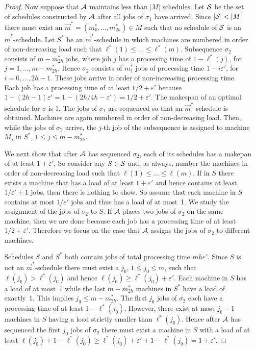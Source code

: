 \documentclass{llncs}
\newcommand{\eps}{\varepsilon}
\begin{document}
\begin{proof}
Now suppose that ${\cal A}$ maintains less than $|M|$ schedules. Let ${\cal S}$ be the set of schedules constructed
by ${\cal A}$ after all jobs of $\sigma_1$ have arrived. Since $|{\cal S}| <|M|$ there must exist an 
$\vec{m}^* = (m_0^*, \ldots, m_{2h}^*) \in M$ such that no schedule of ${\cal S}$ is an $\vec{m}^*$-schedule.
Let $S^*$ be an $\vec{m}^*$-schedule in which machines are numbered in order of non-decreasing load such that
$\ell^*(1) \leq \ldots \leq \ell^*(m)$. Subsequence $\sigma_2$ consists of $m-m_{2h}^*$ jobs, where job $j$
has a processing time of $1-\ell^*(j)$, for $j=1, \ldots,m-m_{2h}^*$. Hence $\sigma_2$ consists of $m_i^*$ jobs
of processing time $1-i\eps'$, for $i=0, \ldots, 2h-1$. These jobs arrive in order of non-increasing processing
time. Each job has a processing time of at least $1/2+\eps'$ because $1-(2h-1)\eps' = 1 - (2h/4h-\eps') = 1/2+\eps'$. 
The makespan of an optimal schedule for $\sigma$ is 1. The jobs of $\sigma_1$ are sequenced so that an 
$\vec{m}^*$-schedule is obtained. Machines are again numbered in order of non-decreasing load. Then, while
the jobs of $\sigma_2$ arrive, the $j$-th job of the subsequence is assigned to machine $M_j$ in $S^*$,
$1\leq j \leq m-m_{2h}^*$.

We next show that after ${\cal A}$ has sequenced $\sigma_2$, each of its schedules has a makepan of at least
$1+\eps'$. So consider any $S\in {\cal S}$ and, as always, number the machines in order of non-decreasing load
such that $\ell(1)\leq \ldots \leq \ell(m)$. If in $S$ there exists a machine that has a load of at least 
$1+\eps'$ and hence contains at least $1/\eps'+1$ jobs, then there is nothing to show. So assume that each
machine in $S$ contains at most $1/\eps'$ jobs and thus has a load of at most~1. We study the assignment
of the jobs of $\sigma_2$ to $S$. If ${\cal A}$ places two jobs of $\sigma_2$ on the same machine, then we are
done because each job has a processing time of at least $1/2+\eps'$. Therefore we focus on the case that
${\cal A}$ assigns the jobs of $\sigma_2$ to different machines. 

Schedules $S$ and $S^*$ both contain jobs of total processing time $mh\eps'$. Since $S$ is not an 
$\vec{m}^*$-schedule there must exist a $j_0$, $1\leq j_0\leq m$, such that $\ell(j_0) > \ell^*(j_0)$
and hence $\ell(j_0) \geq \ell^*(j_0)+\eps'$. Each machine in $S$ has a load of at most~1 while the
last $m-m_{2h}^*$ machines in $S^*$ have a load of exactly~1. This implies $j_0\leq m-m_{2h}^*$.
The first $j_0$ jobs of $\sigma_2$ each have a processing time of at least $1-\ell^*(j_0)$. However,
there exist at most $j_0-1$ machines in $S$ having a load strictly smaller than $\ell^*(j_0)$. Hence
after ${\cal A}$ has sequenced the first $j_0$ jobs of $\sigma_2$ there must exist a machine in
$S$ with a load of at least $\ell(j_0) +1 - \ell^*(j_0) \geq \ell^*(j_0) +\eps' + 1 -\ell^*(j_0)
= 1+\eps'$. 


\end{proof}
\end{document}
